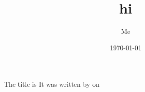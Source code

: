 \documentclass{article}
\title{hi}
\author{Me}
\date{\today}
\makeatletter
\let\newtitle\@title
\makeatother
\begin{document}
  \maketitle

  \makeatletter
  
  

The title is \newtitle
It was written by \@author\space on \@date
  \makeatother
\end{document}
